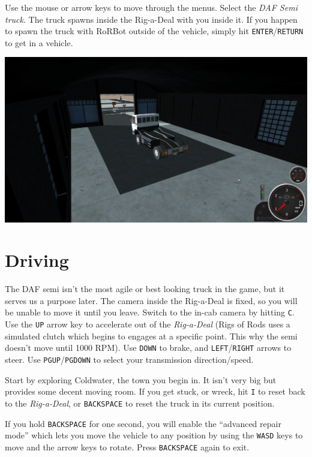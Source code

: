 Use the mouse or arrow keys to move through the menus. Select the
\emph{DAF Semi truck}. The truck spawns inside the Rig-a-Deal with you
inside it. If you happen to spawn the truck with RoRBot outside of the
vehicle, simply hit \texttt{ENTER}/\texttt{RETURN} to get in a vehicle.

\includegraphics{images/bg-daf1.png}

\hypertarget{driving}{%
\section{Driving}\label{driving}}

The DAF semi isn't the most agile or best looking truck in the game, but
it serves us a purpose later. The camera inside the Rig-a-Deal is fixed,
so you will be unable to move it until you leave. Switch to the in-cab
camera by hitting \texttt{C}. Use the \texttt{UP} arrow key to
accelerate out of the \emph{Rig-a-Deal} (Rigs of Rods uses a simulated
clutch which begins to engages at a specific point. This why the semi
doesn't move until 1000 RPM). Use \texttt{DOWN} to brake, and
\texttt{LEFT}/\texttt{RIGHT} arrows to steer. Use
\texttt{PGUP}/\texttt{PGDOWN} to select your transmission
direction/speed.

Start by exploring Coldwater, the town you begin in. It isn't very big
but provides some decent moving room. If you get stuck, or wreck, hit
\texttt{I} to reset back to the \emph{Rig-a-Deal}, or \texttt{BACKSPACE}
to reset the truck in its current position.

If you hold \texttt{BACKSPACE} for one second, you will enable the
``advanced repair mode'' which lets you move the vehicle to any position
by using the \texttt{WASD} keys to move and the arrow keys to rotate.
Press \texttt{BACKSPACE} again to exit.

